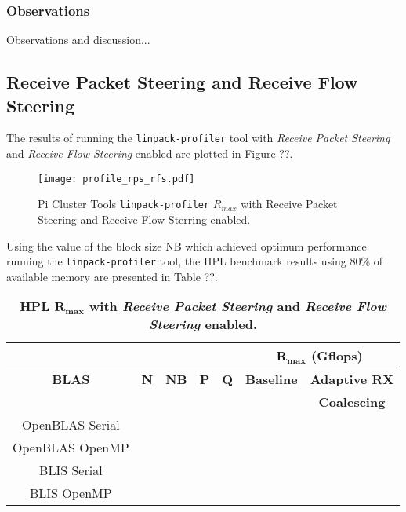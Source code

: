 \subsubsection{Observations}

Observations and discussion...


%
%
\subsection{Receive Packet Steering and Receive Flow Steering}

The results of running the \verb|linpack-profiler| tool with \emph{Receive Packet Steering} and \emph{Receive Flow Steering} enabled are plotted in Figure ??.

\begin{figure}[h!]
	\centering
	\texttt{[image: profile\_rps\_rfs.pdf]}
	\caption{Pi Cluster Tools \texttt{linpack-profiler} $R_{max}$ with Receive Packet Steering and Receive Flow Sterring enabled.}
	\label{fig:subim1}
\end{figure}

Using the value of the block size NB which achieved optimum performance running the \texttt{linpack-profiler} tool, the HPL benchmark results using 80\% of available memory are presented in Table ??. 

\begin{table}[H]
\begin{center}
\begin{tabular}{ |c|c|c|c|c|c|c| } 
\hline
\multicolumn{5}{|c}{} & \multicolumn{2}{|c|}{$\mathbf{R_{max}}$ \textbf{(Gflops)}} \\
\hline
\textbf{BLAS} & \textbf{N} & \textbf{NB} & \textbf{P} & \textbf{Q} & \textbf{Baseline}  & \textbf{Adaptive RX}  \\
              &            &             &            &            &                    & \textbf{Coalescing} \\
\hline
OpenBLAS Serial &  &  &  &  &  &  \\
\hline
OpenBLAS OpenMP &  &  &  &  &  &  \\
\hline
BLIS Serial     &  &  &  &  &  &  \\
\hline
BLIS OpenMP     &  &  &  &  &  &  \\
\hline
\end{tabular}
\end{center}
\caption{\label{tab:table-name}\textbf{HPL $\mathbf{R_{max}}$ with \emph{Receive Packet Steering} and \emph{Receive Flow Steering} enabled.}}
\end{table}


